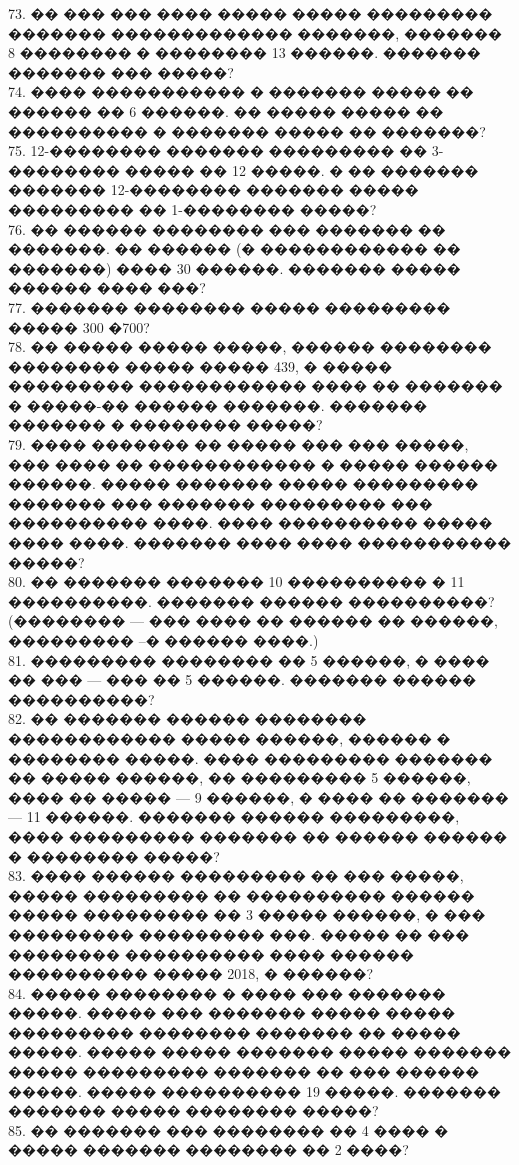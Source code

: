 \documentclass[12pt]{article}
\begin{document}
73. �� ��� ��� ���� ����� ����� ��������� ������� ������������� �������, ������� 8 �������� � �������� 13 ������. ������� ������� ��� �����?\\
74. ���� ����������� � ������� ����� �� ������ �� 6 ������. �� ����� ����� �� ���������� � ������� ����� �� �������?\\
75. 12-�������� ������� ��������� �� 3-�������� ����� �� 12 �����. � �� ������� ������� 12-�������� ������� ����� ��������� �� 1-�������� �����?\\
76. �� ������ �������� ��� ������� �� �������. �� ������ (� ������������ �� �������) ���� 30 ������. ������� ����� ������ ���� ���?\\
77. ������� �������� ����� ��������� ����� 300 �700?\\
78. �� ����� ����� �����, ������ �������� �������� ����� ����� 439, � ����� ��������� ������������ ���� �� ������� � �����-�� ������ �������. ������� ������� � �������� �����?\\
79. ���� ������� �� ����� ��� ��� �����, ��� ���� �� ������������ � ����� ������ ������. ����� ������� ����� ��������� ������� ��� ������� ��������� ��� ���������� ����. ���� ���������� ����� ���� ����. ������� ���� ���� ����������� �����?\\
80. �� ������� ������� 10 ���������� � 11 ����������. ������� ������ ����������? (�������� --- ��� ���� �� ������ �� ������, ��������� --� ������ ����.)\\
81. ��������� �������� �� 5 ������, � ���� �� ��� --- ��� �� 5 ������. ������� ������ ����������?\\
82. �� ������� ������ �������� ������������ ����� ������, ������ � �������� �����. ���� ��������� ������� �� ����� ������, �� ��������� 5 ������, ���� �� ����� --- 9 ������, � ���� �� ������� --- 11 ������. ������� ������ ���������, ���� ��������� ������� �� ������ ������ � �������� �����?\\
83. ���� ������ ��������� �� ��� �����, ����� ��������� �� ���������� ������ ����� ��������� �� 3 ����� ������, � ��� ��������� ��������� ���. ����� �� ��� �������� ���������� ���� ������ ���������� ����� 2018, � ������?\\
84. ����� �������� � ���� ��� ������� �����. ����� ��� ������� ����� ����� ��������� �������� ������� �� ����� �����. ����� ����� ������� ����� ������� ����� ��������� ������� �� ��� ������ �����. ����� ���������� 19 �����. ������� ������� ����� �������� �����?\\
85. �� ������� ��� �������� �� 4 ���� � ����� ������� �������� �� 2 ����?\\
\end{document}
